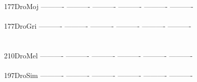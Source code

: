 \documentclass[11pt,twoside,reqno,a4paper]{article}
\begin{document}
{177\hspace*{2\charwidth}DroMoj	----------	----------	----------	----------	----------	----------	\\
\hspace*{5\charwidth}\hspace*{7\charwidth}\hspace*{1\charwidth}\hspace*{1\charwidth}\hspace*{1\charwidth}\hspace*{1\charwidth}\hspace*{1\charwidth}\hspace*{1\charwidth}\\
177\hspace*{2\charwidth}DroGri	----------	----------	----------	----------	----------	----------	\\
\hspace*{5\charwidth}\hspace*{7\charwidth}\hspace*{1\charwidth}\hspace*{1\charwidth}\hspace*{1\charwidth}\hspace*{1\charwidth}\hspace*{1\charwidth}\hspace*{1\charwidth}\\
\\
210\hspace*{2\charwidth}DroMel	----------	----------	----------	----------	----------	----------	\\
\hspace*{5\charwidth}\hspace*{7\charwidth}\hspace*{1\charwidth}\hspace*{1\charwidth}\hspace*{1\charwidth}\hspace*{1\charwidth}\hspace*{1\charwidth}\hspace*{1\charwidth}\\
197\hspace*{2\charwidth}DroSim	----------	----------	----------	----------	----------	----------	\\
\hspace*{5\charwidth}\hspace*{7\charwidth}\hspace*{1\charwidth}\hspace*{1\charwidth}\hspace*{1\charwidth}\hspace*{1\charwidth}\hspace*{1\charwidth}\hspace*{1\charwidth}\\
}
\end{document}
